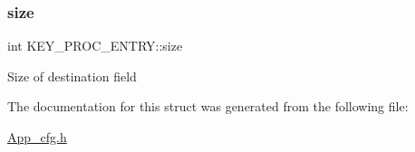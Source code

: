 \subsubsection{\texorpdfstring{size}{size}}
{\footnotesize\ttfamily int K\+E\+Y\+\_\+\+P\+R\+O\+C\+\_\+\+E\+N\+T\+R\+Y\+::size}

Size of destination field 

The documentation for this struct was generated from the following file\+:\begin{DoxyCompactItemize}
\item 
\mbox{\hyperlink{App__cfg_8h}{App\+\_\+cfg.\+h}}\end{DoxyCompactItemize}
